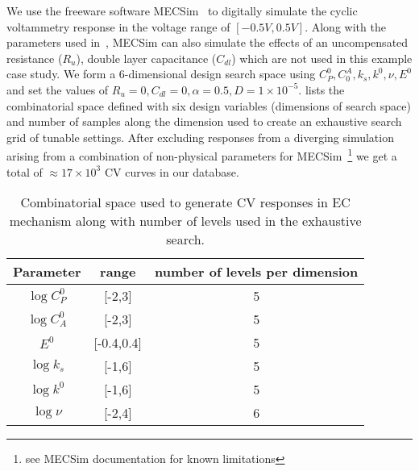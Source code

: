 We use the freeware software MECSim~\cite{kennedy2015monash,MECSim} to digitally simulate the cyclic voltammetry response in the voltage range of \([-0.5V,0.5V]\). 
Along with the parameters used in~, MECSim can also simulate the effects of an uncompensated resistance (\(R_u\)), double layer capacitance (\(C_{dl}\)) which are not used in this example case study. 
We form a 6-dimensional design search space using \(C_P^0, C^A_0, k_{s}, k^0, \nu, E^0\) and set the values of \(R_u = 0, C_{dl} = 0, \alpha=0.5, D=1\times10^{-5}\). 
 lists the combinatorial space defined with six design variables (dimensions of search space) and number of samples along the dimension used to create an exhaustive search grid of tunable settings.
After excluding responses from a diverging simulation arising from a combination of non-physical parameters for MECSim~\footnote{see MECSim documentation for known limitations} we get a total of \(\approx 17\times10^3\) CV curves in our database. 
\begin{table}[h]
\centering
\begin{tabular}{|c|c|c|}
\hline
Parameter & range & number of levels per dimension \\  \hline
\(\log C_P^0 \) &[-2,3] & 5\\ \hline
\(\log C_A^0 \) &[-2,3] & 5\\ \hline
\( E^0 \) &[-0.4,0.4] & 5\\ \hline
\(\log k_{s} \) &[-1,6] & 5\\ \hline
\(\log k^0 \) &[-1,6] & 5\\ \hline
\(\log \nu \) &[-2,4] & 6\\ \hline
\end{tabular}
     \caption{Combinatorial space used to generate CV responses in EC mechanism along with number of levels used in the exhaustive search.}
     \label{tab:search_space}
 \end{table}
 


